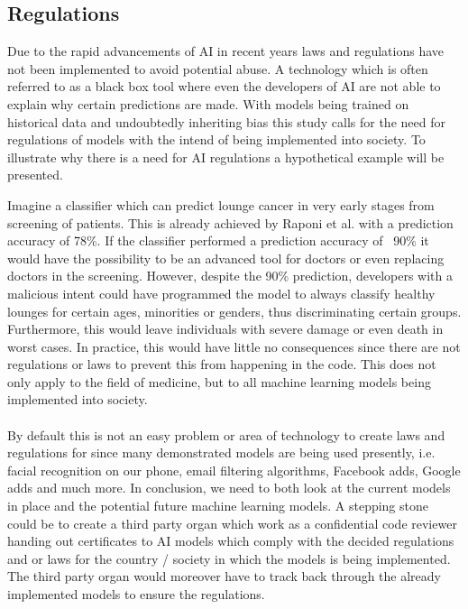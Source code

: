 \documentclass[12pt, fleqn, titlepage]{article}
\begin{document}
\subsection{Regulations}
Due to the rapid advancements of AI in recent years laws and regulations have not been implemented to avoid potential abuse. 
A technology which is often referred to as a black box tool where even the developers of AI are not able to explain why certain predictions are made. 
With models being trained on historical data and undoubtedly inheriting bias this study calls for the need for regulations of models with the intend of being implemented into society. 
To illustrate why there is a need for AI regulations a hypothetical example will be presented.

Imagine a classifier which can predict lounge cancer in very early stages from screening of patients. This is already achieved by Raponi et al. \cite{raponi} with a prediction accuracy of 78\%. If the classifier performed a prediction accuracy of ~90\% it would have the possibility to be an advanced tool for doctors or even replacing doctors in the screening. However, despite the 90\% prediction, developers with a malicious intent could have programmed the model to always classify healthy lounges for certain ages, minorities or genders, thus discriminating certain groups. Furthermore, this would leave individuals with severe damage or even death in worst cases. In practice, this would have little no consequences since there are not regulations or laws to prevent this from happening in the code. This does not only apply to the field of medicine, but to all machine learning models being implemented into society. 
\\\\
By default this is not an easy problem or area of technology to create laws and regulations for since many demonstrated models are being used presently, i.e. facial recognition on our phone, email filtering algorithms, Facebook adds, Google adds and much more. In conclusion, we need to both look at the current models in place and the potential future machine learning models. A stepping stone could be to create a third party organ which work as a confidential code reviewer handing out certificates to AI models which comply with the decided regulations and or laws for the country / society in which the models is being implemented. The third party organ would moreover have to track back through the already implemented models to ensure the regulations.
\end{document}
